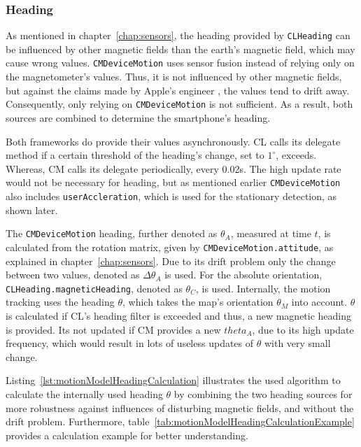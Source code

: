 \subsubsection*{Heading}
As mentioned in chapter~\ref{chap:sensors}, the heading provided by \texttt{CLHeading} can be influenced by other magnetic fields than the earth's magnetic field, which may cause wrong values. \texttt{CMDeviceMotion} uses sensor fusion instead of relying only on the magnetometer's values. Thus, it is not influenced by other magnetic fields, but against the claims made by Apple's engineer \citet{apple:wwdc_2012_pham}, the values tend to drift away. Consequently, only relying on \texttt{CMDeviceMotion} is not sufficient. As a result, both sources are combined to determine the smartphone's heading.

Both frameworks do provide their values asynchronously. \acs{CL} calls its delegate method if a certain threshold of the heading's change, set to $1^\circ$, exceeds. Whereas, \acs{CM} calls its delegate periodically, every 0.02s. The high update rate would not be necessary for heading, but as mentioned earlier \texttt{CMDeviceMotion} also includes \texttt{userAccleration}, which is used for the stationary detection, as shown later.

The \texttt{CMDeviceMotion} heading, further denoted as $\theta_A$, measured at time $t$, is calculated from the rotation matrix, given by \texttt{CMDeviceMotion.attitude}, as explained in chapter~\ref{chap:sensors}. Due to its drift problem only the change between two values, denoted as $\Delta\theta_A$ is used. For the absolute orientation, \texttt{CLHeading.magneticHeading}, denoted as $\theta_C$, is used. Internally, the motion tracking uses the heading $\theta$, which takes the map's orientation $\theta_M$ into account. $\theta$ is calculated if \acs{CL}'s heading filter is exceeded and thus, a new magnetic heading is provided. Its not updated if \acs{CM} provides a new $theta_A$, due to its high update frequency, which would result in lots of useless updates of $\theta$ with very small change.

Listing~\ref{lst:motionModelHeadingCalculation} illustrates the used algorithm to calculate the internally used heading $\theta$ by combining the two heading sources for more robustness against influences of disturbing magnetic fields, and without the drift problem. Furthermore, table~\ref{tab:motionModelHeadingCalculationExample} provides a calculation example for better understanding.




